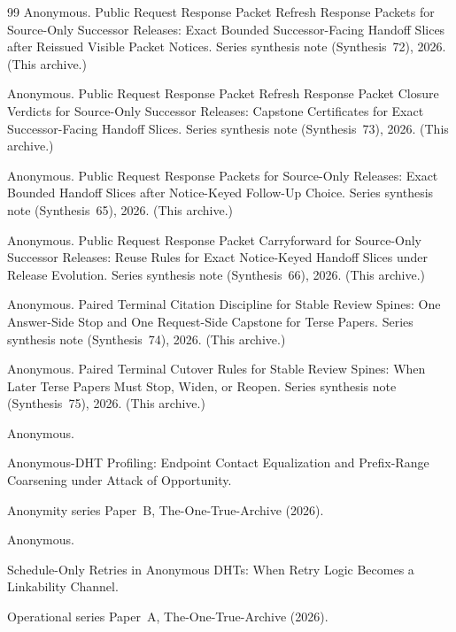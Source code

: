 \documentclass[11pt]{article}
\begin{document}
\begin{thebibliography}{99}
Anonymous.
\newblock Public Request Response Packet Refresh Response Packets for Source-Only Successor Releases: Exact Bounded Successor-Facing Handoff Slices after Reissued Visible Packet Notices.
\newblock Series synthesis note (Synthesis~72), 2026. (This archive.)

Anonymous.
\newblock Public Request Response Packet Refresh Response Packet Closure Verdicts for Source-Only Successor Releases: Capstone Certificates for Exact Successor-Facing Handoff Slices.
\newblock Series synthesis note (Synthesis~73), 2026. (This archive.)

Anonymous.
\newblock Public Request Response Packets for Source-Only Releases: Exact Bounded Handoff Slices after Notice-Keyed Follow-Up Choice.
\newblock Series synthesis note (Synthesis~65), 2026. (This archive.)

Anonymous.
\newblock Public Request Response Packet Carryforward for Source-Only Successor Releases: Reuse Rules for Exact Notice-Keyed Handoff Slices under Release Evolution.
\newblock Series synthesis note (Synthesis~66), 2026. (This archive.)

Anonymous.
\newblock Paired Terminal Citation Discipline for Stable Review Spines: One Answer-Side Stop and One Request-Side Capstone for Terse Papers.
\newblock Series synthesis note (Synthesis~74), 2026. (This archive.)

Anonymous.
\newblock Paired Terminal Cutover Rules for Stable Review Spines: When Later Terse Papers Must Stop, Widen, or Reopen.
\newblock Series synthesis note (Synthesis~75), 2026. (This archive.)


Anonymous.

\newblock Anonymous-DHT Profiling: Endpoint Contact Equalization and Prefix-Range Coarsening under Attack of Opportunity.

\newblock Anonymity series Paper~B, The-One-True-Archive (2026).

Anonymous.

\newblock Schedule-Only Retries in Anonymous DHTs: When Retry Logic Becomes a Linkability Channel.

\newblock Operational series Paper~A, The-One-True-Archive (2026).


\end{thebibliography}
\end{document}

